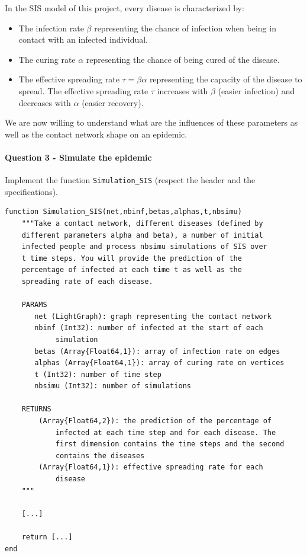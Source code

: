 \documentclass{article}
\begin{document}
In the SIS model of this project, every disease is characterized by:

\begin{itemize}
    \item The infection rate $\beta$ representing the chance of infection when being in contact with an infected individual.
    \item The curing rate $\alpha$ representing the chance of being cured of the disease.
    \item The effective spreading rate $\tau=\beta\alpha$ representing the capacity of the disease to spread. The effective spreading rate $\tau$ increases with $\beta$ (easier infection) and decreases with $\alpha$ (easier recovery).
\end{itemize}

We are now willing to understand what are the influences of these parameters as well as the contact network shape on an epidemic.

\paragraph{Question 3 - Simulate the epidemic} Implement the function \texttt{Simulation\_SIS} (respect the header and the specifications).

\begin{verbatim}
function Simulation_SIS(net,nbinf,betas,alphas,t,nbsimu)
    """Take a contact network, different diseases (defined by 
    different parameters alpha and beta), a number of initial
    infected people and process nbsimu simulations of SIS over
    t time steps. You will provide the prediction of the 
    percentage of infected at each time t as well as the 
    spreading rate of each disease.
    
    PARAMS
       net (LightGraph): graph representing the contact network
       nbinf (Int32): number of infected at the start of each 
            simulation
       betas (Array{Float64,1}): array of infection rate on edges
       alphas (Array{Float64,1}): array of curing rate on vertices
       t (Int32): number of time step
       nbsimu (Int32): number of simulations
    
    RETURNS
        (Array{Float64,2}): the prediction of the percentage of 
            infected at each time step and for each disease. The 
            first dimension contains the time steps and the second
            contains the diseases
        (Array{Float64,1}): effective spreading rate for each 
            disease
    """

    [...]

    return [...]
end
\end{verbatim}
\end{document}
